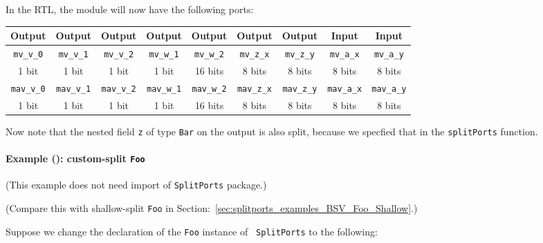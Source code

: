 In the RTL, the module will now have the following ports:

\begin{tabular}{|c|c|c|c|c|c|c||c|c|}
    \hline
     Output &
     Output &
     Output &
     Output &
     Output &
     Output &
     Output &
     Input  &
     Input  \\
    \hline
     {\tt mv\_v\_0}  &
     {\tt mv\_v\_1}  &
     {\tt mv\_v\_2}  &
     {\tt mv\_w\_1}  &
     {\tt mv\_w\_2}  &
     {\tt mv\_z\_x}  &
     {\tt mv\_z\_y}  &
     {\tt mv\_a\_x}  &
     {\tt mv\_a\_y} \\
      1 bit  &
      1 bit  &
      1 bit  &
      1 bit  &
     16 bits &
      8 bits &
      8 bits &
      8 bits &
      8 bits \\
    \hline
     {\tt mav\_v\_0}  &
     {\tt mav\_v\_1}  &
     {\tt mav\_v\_2}  &
     {\tt mav\_w\_1}  &
     {\tt mav\_w\_2}  &
     {\tt mav\_z\_x}  &
     {\tt mav\_z\_y}  &
     {\tt mav\_a\_x}  &
     {\tt mav\_a\_y} \\
      1 bit  &
      1 bit  &
      1 bit  &
      1 bit  &
     16 bits &
      8 bits &
      8 bits &
      8 bits &
      8 bits \\
    \hline
\end{tabular}

Now note that the nested field {\tt z} of type {\tt Bar} on the output
is also split, because we specfied that in the {\tt splitPorts}
function.


\paragraph{Example (\BSV): custom-split {\tt Foo}}

\label{sec:splitports_examples_BSV_Foo_Custom}

\hspace*{1em}

{\footnotesize (This example does not need import of {\tt SplitPorts} package.)}

(Compare this with shallow-split {\tt Foo} in
Section:~\ref{sec:splitports_examples_BSV_Foo_Shallow}.)

Suppose we change the declaration of the {\tt Foo} instance of {\tt
SplitPorts} to the following:

